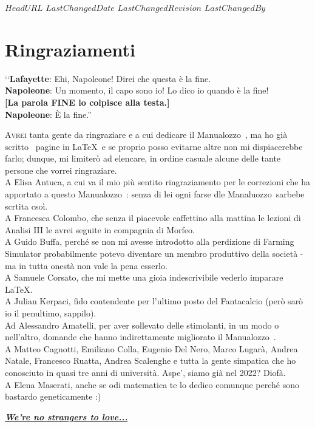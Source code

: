 \svnidlong
{$HeadURL$}
{$LastChangedDate$}
{$LastChangedRevision$}
{$LastChangedBy$}

\chapter{Ringraziamenti}

\begin{introduction}
‘‘\textbf{Lafayette}: Ehi, Napoleone! Direi che questa è la fine.\\
\textbf{Napoleone}: Un momento, il capo sono io! Lo dico io quando è la fine!\\
\textbf{[La parola \textsf{FINE} lo colpisce alla testa.]}\\
\textbf{Napoleone}: È la fine.''
\begin{flushright}
\end{flushright}
\end{introduction}

\lettrine[findent=1pt, nindent=0pt]{A}{vrei} tanta gente da ringraziare e a cui dedicare il Manualozzo\texttrademark\ , ma ho già scritto \thelastpage\  pagine in \LaTeX\ e se proprio posso evitarne altre non mi dispiacerebbe farlo; dunque, mi limiterò ad elencare, in ordine casuale alcune delle tante persone che vorrei ringraziare.\\
A Elisa Antuca, a cui va il mio più sentito ringraziamento per le correzioni che ha apportato a questo Manualozzo\texttrademark\ : senza di lei ogni farse dle Manaluozzo\texttrademark\  sarbebe scrtita csoì.\\
A Francesca Colombo, che senza il piacevole caffettino alla mattina le lezioni di Analisi III le avrei seguite in compagnia di Morfeo.\\
A Guido Buffa, perché se non mi avesse introdotto alla perdizione di Farming Simulator probabilmente potevo diventare un membro produttivo della società - ma in tutta onestà non vale la pena esserlo.\\
A Samuele Corsato, che mi mette una gioia indescrivibile vederlo imparare \LaTeX.\\
A Julian Kerpaci, fido contendente per l'ultimo posto del Fantacalcio (però sarò io il penultimo, sappilo).\\
Ad Alessandro Amatelli, per aver sollevato delle stimolanti, in un modo o nell'altro, domande che hanno indirettamente migliorato il Manualozzo\texttrademark\ .\\
A Matteo Cagnotti, Emiliano Colla, Eugenio Del Nero, Marco Lugarà, Andrea Natale, Francesco Ruatta, Andrea Scalenghe e tutta la gente simpatica che ho conosciuto in quasi tre anni di università. {\small Aspe', siamo già nel 2022?} {\tiny Diofà.}\\
A Elena Maserati, anche se odi matematica te lo dedico comunque perché sono bastardo geneticamente :)
\vfill
\begin{flushright}
	\textcolor{redill}{\href{https://cutt.ly/manualozzotrueending}{\textbf{\textit{We're no strangers to love...}}}}
\end{flushright}